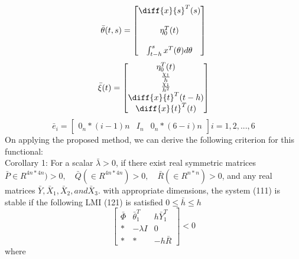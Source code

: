 \documentclass[journal]{IEEEtran}
\begin{document}
\begin{equation}
\bar{\theta}(t,s) = 
\begin{bmatrix}
\diff{x}{s}^T(s) \\ \\
 \eta^{T}_{0}(t) \\ \\
 \int^{s}_{t-h}x^T(\theta)d\theta \\
\end{bmatrix}
\end{equation}
\begin{equation}
\bar{\xi}(t) = 
\begin{bmatrix}
\eta^{T}_{0}(t) \\ 
 \frac{\chi_1}{h} \\ 
 \frac{\chi_1}{h^2} \\
\diff{x}{t}^T(t - h) \\
\diff{x}{t}^T(t) \\
\end{bmatrix}
\end{equation}
\begin{equation}
\bar{e}_i = 
\begin{bmatrix}
0_n*(i-1)n & I_n & 0_n*(6-i)n  
\end{bmatrix}
i=1,2,...,6
\end{equation}
On applying the proposed method, we can derive the following criterion for this functional: 
\\
Corollary 1:
For a scalar $\bar{\lambda} > 0$, if there exist real symmetric matrices
$\bar{P} \in {R^{4n*4n}}) > 0, \quad  \bar{Q}(\text{$\in {R^{4n*4n}}$}) > 0, \quad \bar{R} (\in {R^{n*n}}) > 0$, and any real matrices $\bar{Y},\bar{X}_1,\bar{X}_2, and \bar{X}_3.$
with appropriate dimensions, the system (111) is stable if the following LMI (121) is satisfied $0\leqslant\bar{h}\leqslant h$
\begin{equation}
\begin{bmatrix}
\bar{\Phi} & \bar{\theta}^{T}_{1} & h\bar{Y}^{T}_{1} \\
* & -\lambda I   & 0 \\
* & * & -h\bar{R}
\end{bmatrix}
< 0
\end{equation}
where 
\end{document}
